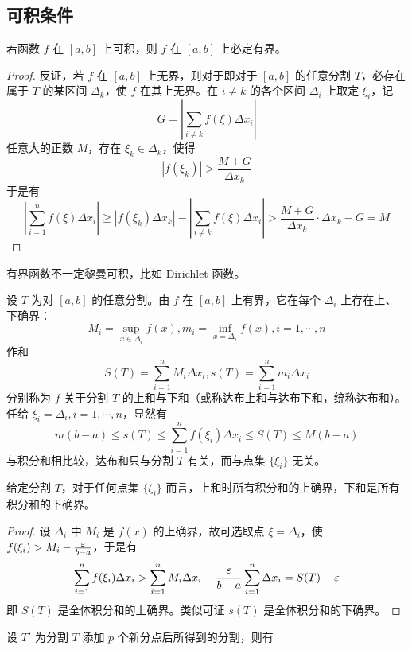 \subsection{可积条件}

\begin{theorem}
	若函数 $f$ 在 $[a,b]$ 上可积，则 $f$ 在 $[a,b]$ 上必定有界。
\end{theorem}
\begin{proof}
	反证，若 $f$ 在 $[a,b]$ 上无界，则对于即对于 $[a,b]$ 的任意分割 $T$，必存在属于 $T$ 的某区间 $\Delta_k$，使 $f$ 在其上无界。在 $i\ne k$ 的各个区间 $\Delta_i$ 上取定 $\xi_i$，记
	\[ G = \left| \sum_{i\ne k}f(\xi)\Delta x_i \right| \]
	任意大的正数 $M$，存在 $\xi_k\in \Delta_k$，使得
	\[ |f(\xi_k)| > \frac{M+G}{\Delta x_k} \]
	于是有
	\[ \left| \sum_{i=1}^nf(\xi)\Delta x_i \right| \geqslant |f(\xi_k)\Delta x_k| - \left| \sum_{i\ne k}f(\xi)\Delta x_i \right| > \frac{M+G}{\Delta x_k}\cdot \Delta x_k - G = M \]
\end{proof}

有界函数不一定黎曼可积，比如 Dirichlet 函数。

设 $T$ 为对 $[a,b]$ 的任意分割。由 $f$ 在 $[a,b]$ 上有界，它在每个 $\Delta_i$ 上存在上、下确界：
\[ M_i=\sup_{x\in\Delta_i}f(x),m_i = \inf_{x=\Delta_i}f(x),i=1,\cdots,n \]
作和
\[ S(T) = \sum_{i=1}^nM_i\Delta x_i, s(T) = \sum_{i=1}^n m_i \Delta x_i \]
分别称为 $f$ 关于分割 $T$ 的上和与下和（或称达布上和与达布下和，统称达布和）。任给 $\xi_i = \Delta_i,i=1,\cdots,n$，显然有
\[ m(b-a) \leqslant s(T) \leqslant \sum_{i=1}^n f(\xi_i)\Delta x_i \leqslant S(T) \leqslant M(b-a) \]
与积分和相比较，达布和只与分割 $T$ 有关，而与点集 $\{\xi_i\}$ 无关。

\begin{proposition}
	给定分割 $T$，对于任何点集 $\{\xi_i\}$ 而言，上和时所有积分和的上确界，下和是所有积分和的下确界。
\end{proposition}
\begin{proof}
	设 $\Delta_i$ 中 $M_i$ 是 $f(x)$ 的上确界，故可选取点 $\xi=\Delta_i$，使 $f(\xi_i)>M_i-\frac{\varepsilon}{b-a}$，于是有
	\[ \sum_{i=1}^nf(\xi_i)\Delta x_i > \sum_{i=1}^nM_i\Delta x_i-\frac{\varepsilon}{b-a}\sum_{i=1}^n\Delta x_i = S(T)-\varepsilon \]
	即 $S(T)$ 是全体积分和的上确界。类似可证 $s(T)$ 是全体积分和的下确界。
\end{proof}


\begin{proposition}
	设 $T'$ 为分割 $T$ 添加 $p$ 个新分点后所得到的分割，则有

\end{proposition}

